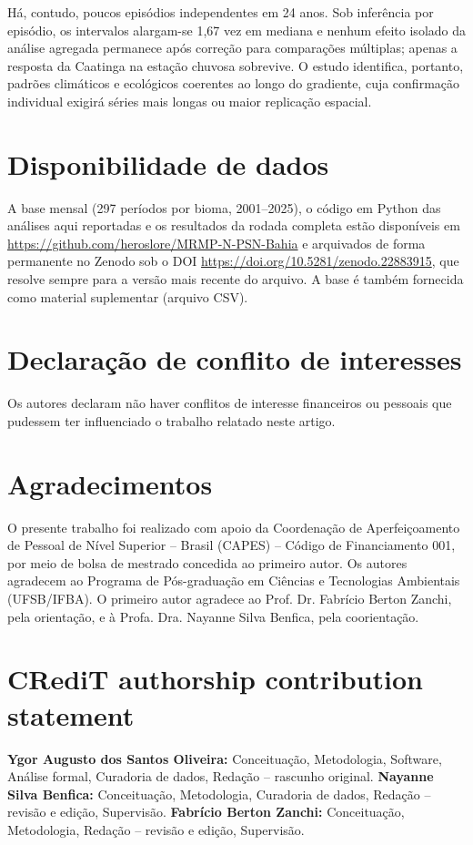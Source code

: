 \documentclass[a4paper,fleqn]{cas-sc}
\begin{document}
Há, contudo, poucos episódios independentes em 24 anos. Sob inferência por episódio, os intervalos alargam-se 1,67 vez em mediana e nenhum efeito isolado da análise agregada permanece após correção para comparações múltiplas; apenas a resposta da Caatinga na estação chuvosa sobrevive. O estudo identifica, portanto, padrões climáticos e ecológicos coerentes ao longo do gradiente, cuja confirmação individual exigirá séries mais longas ou maior replicação espacial.

\section*{Disponibilidade de dados}
A base mensal (297 períodos por bioma, 2001--2025), o código em Python das análises aqui reportadas e os resultados da rodada completa estão disponíveis em \url{https://github.com/heroslore/MRMP-N-PSN-Bahia} e arquivados de forma permanente no Zenodo sob o DOI \url{https://doi.org/10.5281/zenodo.22883915}, que resolve sempre para a versão mais recente do arquivo. A base é também fornecida como material suplementar (arquivo CSV).

\section*{Declaração de conflito de interesses}
Os autores declaram não haver conflitos de interesse financeiros ou pessoais que pudessem ter influenciado o trabalho relatado neste artigo.

\section*{Agradecimentos}
O presente trabalho foi realizado com apoio da Coordenação de Aperfeiçoamento de Pessoal de Nível Superior -- Brasil (CAPES) -- Código de Financiamento 001, por meio de bolsa de mestrado concedida ao primeiro autor. Os autores agradecem ao Programa de Pós-graduação em Ciências e Tecnologias Ambientais (UFSB/IFBA). O primeiro autor agradece ao Prof. Dr. Fabrício Berton Zanchi, pela orientação, e à Profa. Dra. Nayanne Silva Benfica, pela coorientação.

\section*{CRediT authorship contribution statement}
\textbf{Ygor Augusto dos Santos Oliveira:} Conceituação, Metodologia, Software, Análise formal, Curadoria de dados, Redação -- rascunho original. \textbf{Nayanne Silva Benfica:} Conceituação, Metodologia, Curadoria de dados, Redação -- revisão e edição, Supervisão. \textbf{Fabrício Berton Zanchi:} Conceituação, Metodologia, Redação -- revisão e edição, Supervisão.



\end{document}
